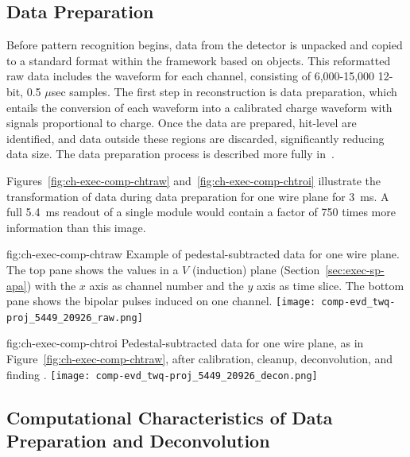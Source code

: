 \subsection{Data Preparation}

Before pattern recognition begins, data from the  detector is
unpacked and copied to a standard format within the  framework based on  objects. 
This reformatted raw data includes the waveform for each channel, consisting of 6,000-15,000  12-bit, 0.5 $\mu$sec samples. 
The first step in reconstruction is data preparation, which entails the conversion of each  waveform into a calibrated charge waveform with
signals proportional to charge. Once the data are prepared, hit-level  are identified, and data outside these regions are discarded, significantly reducing data size. The data preparation process is described more fully in~\cite{bib:docdb12349}. 

Figures~\ref{fig:ch-exec-comp-chtraw} and~\ref{fig:ch-exec-comp-chtroi} illustrate the transformation of  data  during data preparation 
for one wire plane for \SI{3}{ms}.  A full \SI{5.4}{ms} readout of a single \nominalmodsize module would contain a factor of 750 times 
more information than this image.
\begin{dunefigure}
{fig:ch-exec-comp-chtraw}
{Example of pedestal-subtracted data for one   wire plane.  The top pane shows the  values in a $V$ (induction) plane (Section~\ref{sec:exec-sp-apa}) with the $x$ axis as channel number and the $y$ axis as time slice. The bottom pane shows the bipolar pulses induced on one channel.}
\texttt{[image: comp-evd\_twq-proj\_5449\_20926\_raw.png]}
\end{dunefigure}


\begin{dunefigure}
{fig:ch-exec-comp-chtroi}
{Pedestal-subtracted data for one  wire plane, as in Figure~\ref{fig:ch-exec-comp-chtraw}, after calibration, cleanup, deconvolution, and finding .}
 \texttt{[image: comp-evd\_twq-proj\_5449\_20926\_decon.png]}
\end{dunefigure}


\subsection{Computational Characteristics of Data Preparation and Deconvolution }

